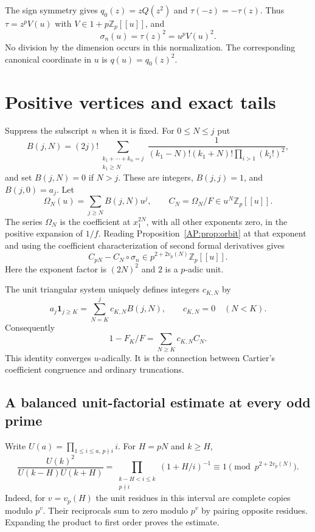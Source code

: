 \documentclass[11pt,a4paper]{article}
\theoremstyle{definition}\newtheorem{definition}[theorem]{Definition}
\theoremstyle{remark}\newtheorem{remark}[theorem]{Remark}
\numberwithin{equation}{section}
\begin{document}
The sign symmetry gives $q_0(z)=zQ(z^2)$ and
$\tau(-z)=-\tau(z)$. Thus $\tau=z^pV(u)$ with
$V\in1+p\mathbb Z_p[[u]]$, and
\[
 \sigma_n(u)=\tau(z)^2=u^pV(u)^2.
\]
No division by the dimension occurs in this normalization. The
corresponding canonical coordinate in $u$ is $q(u)=q_0(z)^2$.

\section{Positive vertices and exact tails}\label{AP:source-main-3}\label{AP:sec:positive}
Suppress the subscript $n$ when it is fixed. For $0\le N\le j$ put
\[
 B(j,N)=(2j)!\sum_{\substack{k_1+\cdots+k_n=j\\k_1\ge N}}
 \frac{1}{(k_1-N)!(k_1+N)!\prod_{i>1}(k_i!)^2},
\]
and set $B(j,N)=0$ if $N>j$. These are integers, $B(j,j)=1$, and
$B(j,0)=a_j$. Let
\[
 \Omega_N(u)=\sum_{j\ge N}B(j,N)u^j,\qquad
 C_N=\Omega_N/F\in u^N\mathbb Z_p[[u]].
\]
The series $\Omega_N$ is the coefficient at $x_1^{2N}$, with all
other exponents zero, in the positive expansion of $1/f$. Reading
Proposition~\ref{AP:prop:orbit} at that exponent and using the
coefficient characterization of second formal derivatives gives
\begin{equation}\label{AP:eq:positive-cartier}
 C_{pN}-C_N\circ\sigma_n
       \in p^{2+2v_p(N)}\mathbb Z_p[[u]].
\end{equation}
Here the exponent factor is $(2N)^2$ and $2$ is a $p$-adic unit.

The unit triangular system uniquely defines integers $c_{K,N}$ by
\[
 a_j\mathbf1_{j\ge K}=\sum_{N=K}^jc_{K,N}B(j,N),
 \qquad c_{K,N}=0\quad(N<K).
\]
Consequently
\begin{equation}\label{AP:eq:exact-tail}
 1-F_K/F=\sum_{N\ge K}c_{K,N}C_N.
\end{equation}
This identity converges $u$-adically. It is the connection between
Cartier's coefficient congruence and ordinary truncations.

\subsection{A balanced unit-factorial estimate at every odd prime}
Write $U(a)=\prod_{1\le i\le a,\,p\nmid i}i$. For $H=pN$ and $k\ge H$,
\[
 \frac{U(k)^2}{U(k-H)U(k+H)}
 =\prod_{\substack{k-H<i\le k\\p\nmid i}}(1+H/i)^{-1}
 \equiv1\pmod{p^{2+2v_p(N)}}.
\]
Indeed, for $v=v_p(H)$ the unit residues in this interval are complete
copies modulo $p^v$. Their reciprocals sum to zero modulo $p^v$ by
pairing opposite residues. Expanding the product to first order proves
the estimate.
\end{document}
